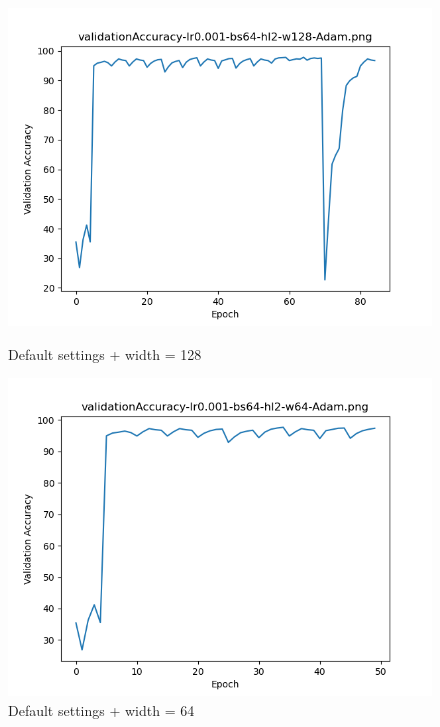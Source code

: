 \documentclass{article}[12pt]
\begin{document}
    \begin{figure}[H]
        \includegraphics[width=\linewidth]{testsResults/validationAccuracy/def.png}
        \caption{Default settings + width = 128}
        \endminipage\hfill
        \includegraphics[width=\linewidth]{testsResults/validationAccuracy/validationAccuracy-lr0.001-bs64-hl2-w64-Adam.png}
        \caption{Default settings + width = 64}
        \endminipage
    \end{figure}
\end{document}
